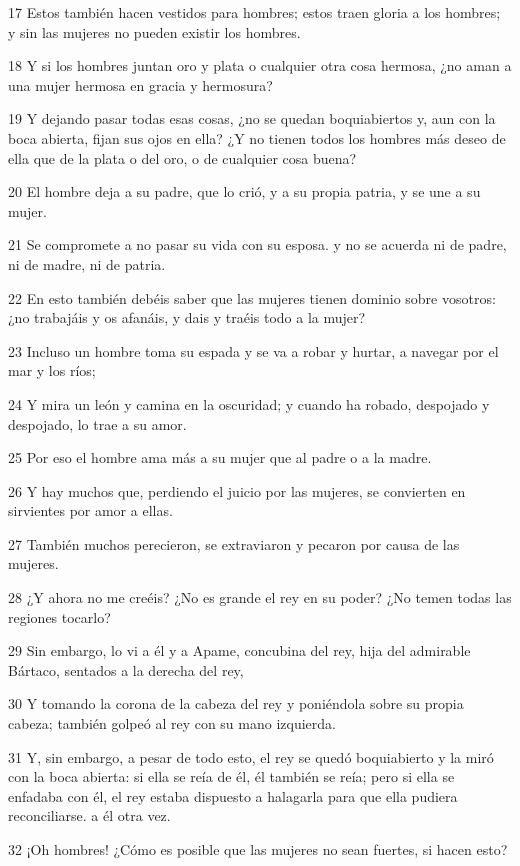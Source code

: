 \par 17 Estos también hacen vestidos para hombres; estos traen gloria a los hombres; y sin las mujeres no pueden existir los hombres.
\par 18 Y si los hombres juntan oro y plata o cualquier otra cosa hermosa, ¿no aman a una mujer hermosa en gracia y hermosura?
\par 19 Y dejando pasar todas esas cosas, ¿no se quedan boquiabiertos y, aun con la boca abierta, fijan sus ojos en ella? ¿Y no tienen todos los hombres más deseo de ella que de la plata o del oro, o de cualquier cosa buena?
\par 20 El hombre deja a su padre, que lo crió, y a su propia patria, y se une a su mujer.
\par 21 Se compromete a no pasar su vida con su esposa. y no se acuerda ni de padre, ni de madre, ni de patria.
\par 22 En esto también debéis saber que las mujeres tienen dominio sobre vosotros: ¿no trabajáis y os afanáis, y dais y traéis todo a la mujer?
\par 23 Incluso un hombre toma su espada y se va a robar y hurtar, a navegar por el mar y los ríos;
\par 24 Y mira un león y camina en la oscuridad; y cuando ha robado, despojado y despojado, lo trae a su amor.
\par 25 Por eso el hombre ama más a su mujer que al padre o a la madre.
\par 26 Y hay muchos que, perdiendo el juicio por las mujeres, se convierten en sirvientes por amor a ellas.
\par 27 También muchos perecieron, se extraviaron y pecaron por causa de las mujeres.
\par 28 ¿Y ahora no me creéis? ¿No es grande el rey en su poder? ¿No temen todas las regiones tocarlo?
\par 29 Sin embargo, lo vi a él y a Apame, concubina del rey, hija del admirable Bártaco, sentados a la derecha del rey,
\par 30 Y tomando la corona de la cabeza del rey y poniéndola sobre su propia cabeza; también golpeó al rey con su mano izquierda.
\par 31 Y, sin embargo, a pesar de todo esto, el rey se quedó boquiabierto y la miró con la boca abierta: si ella se reía de él, él también se reía; pero si ella se enfadaba con él, el rey estaba dispuesto a halagarla para que ella pudiera reconciliarse. a él otra vez.
\par 32 ¡Oh hombres! ¿Cómo es posible que las mujeres no sean fuertes, si hacen esto?
